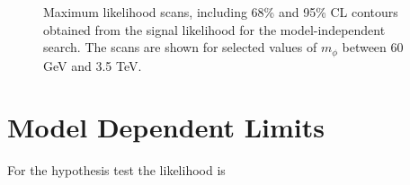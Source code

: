 \begin{figure}[!hbtp]
\caption{Maximum likelihood scans, including 68\% and 95\% CL contours obtained from the signal likelihood for the model-independent search. The scans are shown for selected values of $m_{\phi}$ between 60 GeV and 3.5 TeV.}
\label{fig:2d_likelihood_scans}
\end{figure}

\newpage
\section{Model Dependent Limits}

For the hypothesis test the likelihood is
%

